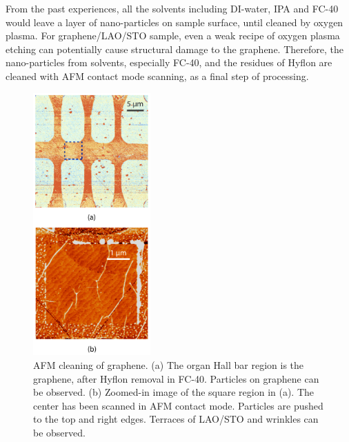 \documentclass[pdflatex, sectionletters, 12pt]{pittetd}    %
\begin{document}
From the past experiences, all the solvents including DI-water, IPA and FC-40 would leave a layer of nano-particles on sample surface, until cleaned by oxygen plasma. For graphene/LAO/STO sample, even a weak recipe of oxygen plasma etching can potentially cause structural damage to the graphene. Therefore, the nano-particles from solvents, especially FC-40, and the residues of Hyflon are cleaned with AFM contact mode scanning, as a final step of processing. 

\begin{figure}[p]
	\centering
	\includegraphics[width=0.4\textwidth]{Drawing/GrapheneAC.pdf}
	\caption{AFM cleaning of graphene. (a) The organ Hall bar region is the graphene, after Hyflon removal in FC-40. Particles on graphene can be observed. (b) Zoomed-in image of the square region in (a). The center has been scanned in AFM contact mode. Particles are pushed to the top and right edges. Terraces of LAO/STO and wrinkles can be observed.}
	\label{FIG:GrapheneAC}
\end{figure}
\end{document}
